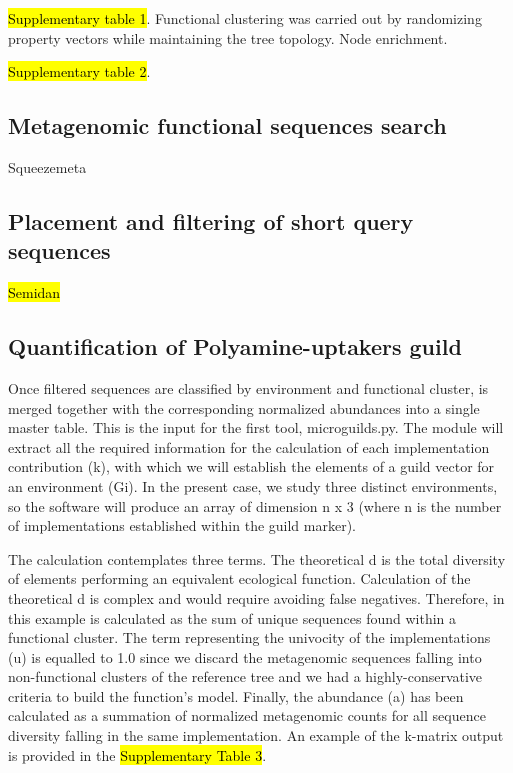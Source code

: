 \documentclass[Journal,letterpaper,NoLists]{ascelike-new}
\begin{document}
\hl{Supplementary table 1}.
Functional clustering was carried out by randomizing property vectors while maintaining the tree topology. Node enrichment. 

\hl{Supplementary table 2}.

\subsection{Metagenomic functional sequences search}

Squeezemeta \cite{tamames2019squeezemeta}

\subsection{Placement and filtering of short query sequences}

\hl{Semidan}


\subsection{Quantification of Polyamine-uptakers guild}

Once filtered sequences are classified by environment and functional cluster, is merged together with the corresponding normalized abundances into a single master table. This is the input for the first tool, microguilds.py. The module will extract all the required information for the calculation of each implementation contribution (k), with which we will establish the elements of a guild vector for an environment (Gi). In the present case, we study three distinct environments, so the software will produce an array of dimension n x 3 (where n is the number of implementations established within the guild marker).

The calculation contemplates three terms. The theoretical d is the total diversity of elements performing an equivalent ecological function. Calculation of the theoretical d is complex and would require avoiding false negatives. Therefore, in this example is calculated as the sum of unique sequences found within a functional cluster. The term representing the univocity of the implementations (u) is equalled to 1.0 since we discard the metagenomic sequences falling into non-functional clusters of the reference tree and we had a highly-conservative criteria to build the function's model. Finally, the abundance (a) has been calculated as a summation of normalized metagenomic counts for all sequence diversity falling in the same implementation. An example of the k-matrix output is provided in the \hl{Supplementary Table 3}.
\end{document}
